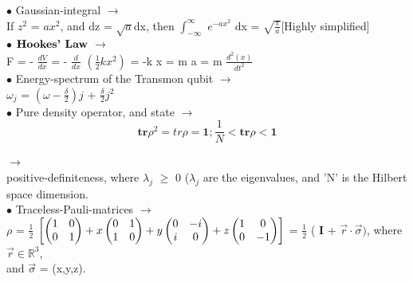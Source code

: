 \documentclass[a4paper, 10pt, onepage]{elegantbook}
\begin{document}
{$\bullet$ Gaussian-integral $\longrightarrow$  \\

If $z^2$ = ${a}x^2$, and dz = $\sqrt{a}$dx, then $\int_{- \infty}^\infty$ $e^{- a x^2}$ dx = $\sqrt{ \frac{\pi}{a}}$[Highly simplified] \\

$\bullet$ $\mathbf{\textbf{Hookes' Law}\index{Hookes' Law}}$ $\longrightarrow$ \\

F = - $\frac{dV}{dx}$ = - $\frac{d}{dx}$ $\left( \frac{1}{2} k {x^2} \right)$ = -k x = m a = m $\frac{d^2(x)}{dt^2}$ \\

$\bullet$ Energy-spectrum of the Transmon qubit $\longrightarrow$  \\ 

$\omega_j$ = $\left( \omega - \frac{\delta}{2} \right) j$ + $\frac{\delta}{2} j^2$ \\

$\bullet$ Pure density operator, and state $\longrightarrow$ \\
\begin{equation}
\mathbf{tr} \rho^2 = tr \rho = \mathbf{1} ; \frac{1}{N} < \mathbf{tr} \rho < \mathbf{1}
\end{equation}

$\rightarrow$  \\

positive-definiteness, where $\lambda_j$ $\geq$ 0 ($\lambda_j$ are the eigenvalues, and 'N' is the Hilbert space dimension. \\

$\bullet$ Traceless-Pauli-matrices $\longrightarrow$  \\

$\rho$ = $\frac{1}{2}$ $\left[ \begin{pmatrix}1 & 0 \cr 0 & 1 \end{pmatrix} + x \begin{pmatrix}0 & 1 \cr 1 & 0 \end{pmatrix} + y \begin{pmatrix}0 & -i \cr i & 0  \\ \end{pmatrix} + z \begin{pmatrix}1 & 0 \cr 0 & -1 \end{pmatrix} \right]$  = $\frac{1}{2}$ ( $\mathbf{I}$ + $\vec{r} \cdot \vec{\sigma})$, where $\vec{r} \in \mathbb R^3$,\\ and $\vec{\sigma}$ = (x,y,z). \\

}
\end{document}
